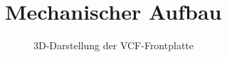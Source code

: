\section{Mechanischer Aufbau}
\begin{figure}[h]
	\centering
	\setlength{\fboxsep}{1pt} %
	\setlength{\fboxrule}{1pt} %
	\caption{3D-Darstellung der VCF-Frontplatte}
\end{figure}
